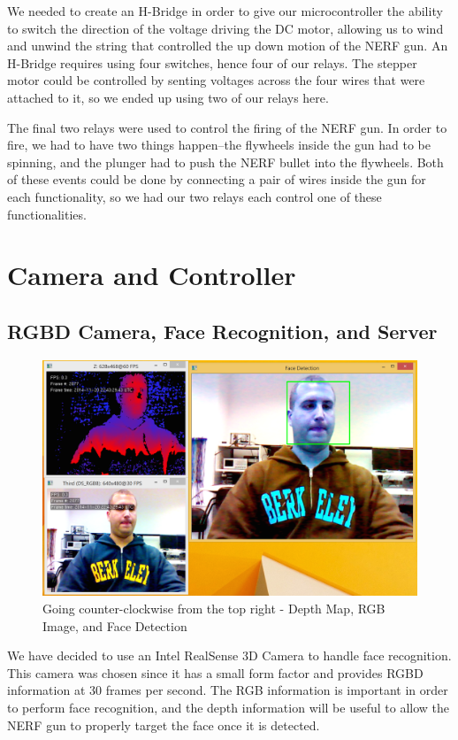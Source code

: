 \documentclass[journal]{IEEEtran}
\begin{document}
We needed to create an H-Bridge in order to give our microcontroller the ability to switch the direction of the voltage driving the DC motor, allowing us to wind and unwind the string that controlled the up down motion of the NERF gun. An H-Bridge requires using four switches, hence four of our relays. The stepper motor could be controlled by senting voltages across the four wires that were attached to it, so we ended up using two of our relays here.

The final two relays were used to control the firing of the NERF gun. In order to fire, we had to have two things happen--the flywheels inside the gun had to be spinning, and the plunger had to push the NERF bullet into the flywheels. Both of these events could be done by connecting a pair of wires inside the gun for each functionality, so we had our two relays each control one of these functionalities.

\section{Camera and Controller}

\subsection{RGBD Camera, Face Recognition, and Server}

\begin{figure}[htbp]
    \centering
    \includegraphics[width=0.85\linewidth]{face_detection.png}
    \caption{Going counter-clockwise  from the top right - Depth Map, RGB Image, and Face Detection}
    \label{fig:face}
\end{figure}

We have decided to use an Intel RealSense 3D Camera to handle face recognition. This camera was chosen since it has a small form factor and provides RGBD information at 30 frames per second. The RGB information is important in order to perform face recognition, and the depth information will be useful to allow the NERF gun to properly target the face once it is detected.
\end{document}
